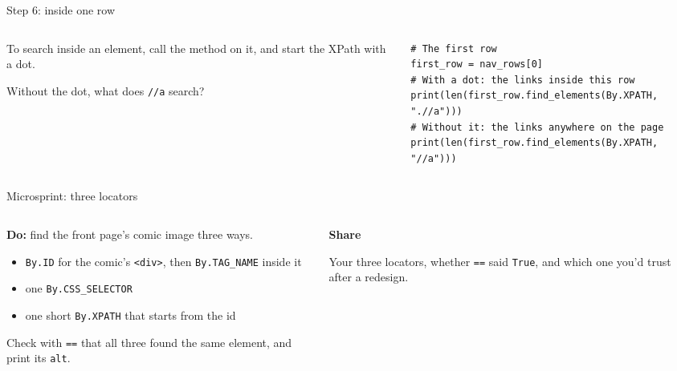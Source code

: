 \documentclass[9pt,aspectratio=169]{beamer}
\begin{document}
\begin{frame}[fragile]{Step 6: inside one row}
    \begin{columns}[T]
        \begin{column}{0.37\textwidth}
            To search inside an element, call the method on it, and start the XPath with a dot.

            \medskip
            Without the dot, what does \texttt{//a} search?
        \end{column}
        \begin{column}{0.6\textwidth}
\begin{lstlisting}[style=lab]
# The first row
first_row = nav_rows[0]
# With a dot: the links inside this row
print(len(first_row.find_elements(By.XPATH, ".//a")))
# Without it: the links anywhere on the page
print(len(first_row.find_elements(By.XPATH, "//a")))
\end{lstlisting}
        \end{column}
    \end{columns}
\end{frame}

\begin{frame}{Microsprint: three locators}
    \begin{columns}[T]
        \begin{column}{0.6\textwidth}
            \textbf{Do:} find the front page's comic image three ways.
            \begin{itemize}\small
                \item \texttt{By.ID} for the comic's \texttt{<div>}, then \texttt{By.TAG\_NAME} inside it
                \item one \texttt{By.CSS\_SELECTOR}
                \item one short \texttt{By.XPATH} that starts from the id
            \end{itemize}
            Check with \texttt{==} that all three found the same element, and print its \texttt{alt}.
        \end{column}
        \begin{column}{0.35\textwidth}
            \textbf{Share}\\[2pt]
            {\footnotesize Your three locators, whether \texttt{==} said \texttt{True}, and which one you'd trust after a redesign.\par}
        \end{column}
    \end{columns}
\end{frame}
\end{document}
